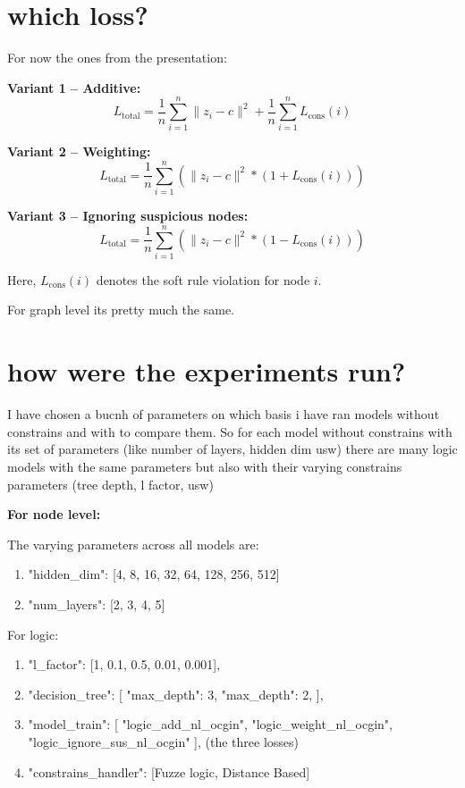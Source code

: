 \documentclass[a4paper,12pt]{article}
\begin{document}
\section{which loss?}

For now the ones from the presentation:

\textbf{Variant 1 -- Additive:}
\[
L_{\text{total}} = \frac{1}{n}\sum_{i=1}^{n} \|z_i - c\|^2 
+ \frac{1}{n}\sum_{i=1}^{n} L_{\text{cons}}(i)
\]

\textbf{Variant 2 -- Weighting:}
\[
L_{\text{total}} = \frac{1}{n}\sum_{i=1}^{n} 
\left( \|z_i - c\|^2 * (1 + L_{\text{cons}}(i)) \right)
\]

\textbf{Variant 3 -- Ignoring suspicious nodes:}
\[
L_{\text{total}} = \frac{1}{n}\sum_{i=1}^{n} 
\left( \|z_i - c\|^2 * (1 - L_{\text{cons}}(i)) \right)
\]

Here, $L_{\text{cons}}(i)$ denotes the soft rule violation for node $i$.

For graph level its pretty much the same.

\section{how were the experiments run?}

I have chosen a bucnh of parameters on which basis i have ran models without constrains and with to compare them. So for each model without constrains with its set of parameters (like number of layers, hidden dim usw) there are many logic models with the same parameters but also with their varying constrains parameters (tree depth, l factor, usw)

\textbf{For node level:}

The varying parameters across all models are:
\begin{enumerate}
    \item "hidden\_dim": [4, 8, 16, 32, 64, 128, 256, 512]
    \item "num\_layers": [2, 3, 4, 5] 
\end{enumerate}

For logic:

\begin{enumerate}
    \item "l\_factor": [1, 0.1, 0.5, 0.01, 0.001],
    \item "decision\_tree": [
            "max\_depth": 3,
            "max\_depth": 2,
        ],
    \item "model\_train": [
            "logic\_add\_nl\_ocgin",
            "logic\_weight\_nl\_ocgin",
            "logic\_ignore\_sus\_nl\_ocgin"
        ], (the three losses)
    \item "constrains\_handler": [Fuzze logic, Distance Based]
\end{enumerate}
\end{document}
